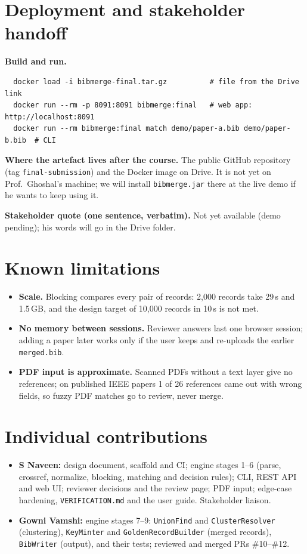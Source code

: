 \documentclass[11pt,a4paper]{article}
\begin{document}
\section{Deployment and stakeholder handoff}

\textbf{Build and run.}
\begin{verbatim}
  docker load -i bibmerge-final.tar.gz          # file from the Drive link
  docker run --rm -p 8091:8091 bibmerge:final   # web app: http://localhost:8091
  docker run --rm bibmerge:final match demo/paper-a.bib demo/paper-b.bib  # CLI
\end{verbatim}

\textbf{Where the artefact lives after the course.}
The public GitHub repository (tag \texttt{final-submission}) and the Docker
image on Drive.  It is not yet on Prof.\ Ghoshal's machine; we will install
\texttt{bibmerge.jar} there at the live demo if he wants to keep using it.

\textbf{Stakeholder quote (one sentence, verbatim).}
Not yet available (demo pending); his words will go in the Drive folder.

\section{Known limitations}

\begin{itemize}[leftmargin=*,nosep]
  \item \textbf{Scale.}  Blocking compares every pair of records: 2,000 records
        take 29\,s and 1.5\,GB, and the design target of 10,000 records in
        10\,s is not met.
  \item \textbf{No memory between sessions.}  Reviewer answers last one browser
        session; adding a paper later works only if the user keeps and
        re-uploads the earlier \texttt{merged.bib}.
  \item \textbf{PDF input is approximate.}  Scanned PDFs without a text layer
        give no references; on published IEEE papers 1 of 26 references came
        out with wrong fields, so fuzzy PDF matches go to review, never merge.
\end{itemize}

\section{Individual contributions}

\begin{itemize}[leftmargin=*,nosep]
  \item \textbf{S Naveen:} design document, scaffold and CI; engine stages 1--6
        (parse, crossref, normalize, blocking, matching and decision rules);
        CLI, REST API and web UI; reviewer decisions and the review page; PDF
        input; edge-case hardening, \texttt{VERIFICATION.md} and the user guide.
        Stakeholder liaison.
  \item \textbf{Gowni Vamshi:} engine stages 7--9: \texttt{UnionFind} and
        \texttt{ClusterResolver} (clustering), \texttt{KeyMinter} and
        \texttt{GoldenRecordBuilder} (merged records), \texttt{BibWriter}
        (output), and their tests; reviewed and merged PRs \#10--\#12.
\end{itemize}
\end{document}

